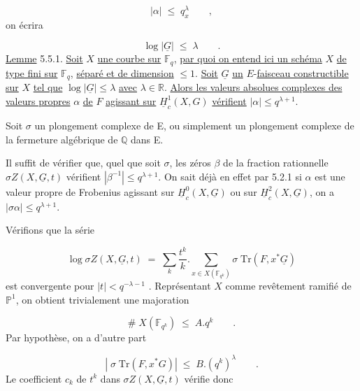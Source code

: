 \begin{equation*}
|\alpha| \;\leqslant\; q_x^{\lambda} \qquad ,
\end{equation*}
on écrira

\begin{equation*}
\log |\underline{G}| \;\leqslant\; \lambda \qquad .
\end{equation*}
\underline{Lemme} 5.5.1. \underline{Soit} $X$ \underline{une courbe sur} $\mathbb{F}_q$, \underline{par quoi on entend ici un schéma} $X$ \underline{de type fini sur} $\mathbb{F}_q$, \underline{séparé et de dimension} $\leqslant 1$. \underline{Soit} $\underline{G}$ \underline{un} $E$-\underline{faisceau constructible sur} $X$ \underline{tel que} $\log |\underline{G}| \leqslant \lambda$ \underline{avec} $\lambda \in \mathbb{R}$. \underline{Alors les valeurs absolues complexes des valeurs propres} $\alpha$ \underline{de} $F$ \underline{agissant sur} $\underline{H}^1_c(X,G)$ \underline{vérifient} $|\alpha| \leqslant q^{\lambda+1}$.

Soit $\sigma$ un plongement complexe de E, ou simplement un plongement complexe de la fermeture algébrique de $\mathbb{Q}$ dans E.

Il suffit de vérifier que, quel que soit $\sigma$, les zéros $\beta$ de la fraction rationnelle $\sigma Z(X,\underline{G},t)$ vérifient $|\beta^{-1}| \leqslant q^{\lambda+1}$. On sait déjà en
effet par 5.2.1 si $\alpha$ est une valeur propre de Frobenius agissant sur $\underline{H}^0_c(X,\underline{G})$ ou sur $\underline{H}^2_c(X,\underline{G})$, on a $|\sigma \alpha| \leqslant q^{\lambda+1}$.

Vérifions que la série

\begin{equation*}
\log \sigma Z(X,\underline{G},t) \;=\; \sum_k \frac{t^k}{k} . \sum_{x \in X(\mathbb{F}_{q^k})} \sigma \; \mathrm{Tr}(F,x^*\underline{G})
\end{equation*}
est convergente pour $|t| < q^{-\lambda-1}$ . Représentant $X$ comme revêtement ramifié de $\mathbb{P}^1$, on obtient trivialement une majoration

\begin{equation*}
\# \; X(\mathbb{F}_{q^k}) \;\leqslant\; A.q^k \qquad .
\end{equation*}
Par hypothèse, on a d'autre part

\begin{equation*}
\left| \; \sigma \; \mathrm{Tr}(F,x^*G) \right| \;\leqslant\; B.(q^k)^{\lambda} \qquad .
\end{equation*}
Le coefficient $c_k$ de $t^k$ dans $\sigma Z (X,\underline{G},t)$ vérifie donc

